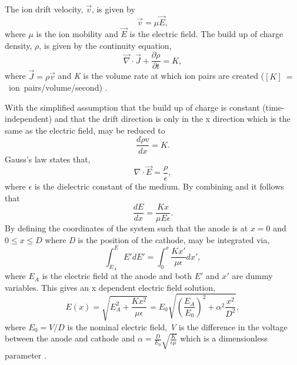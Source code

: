 The ion drift velocity, $\vec v$, is given by
\begin{equation}
    \vec v = \mu \vec E,
\end{equation}
where $\mu$ is the ion mobility and $\vec E$ is the electric field. The build up of charge density, $\rho$, is given by the continuity equation,
\begin{equation}
    \vec \nabla \cdot \vec J + \frac{\partial \rho}{\partial t} = K,
\label{eq:space_charge_continuity}
\end{equation}
where $\vec J = \rho \vec v$ and \textit{K} is the volume rate at which ion pairs are created \newline ($[K]~=~$~ion~pairs/volume/second) \cite{space_charge_math}. 

With the simplified assumption that the build up of charge is constant (time-independent) and that the drift direction is only in the x direction which is the same as the electric field,  may be reduced to 
\begin{equation}
    \frac{d \rho v}{dx} = K.
\label{eq:reduced_sapce_charge_continuity}
\end{equation}
Gauss's law states that,
\begin{equation}
    \nabla \cdot \vec E = \frac{\rho}{\epsilon},
\label{eq:Gauss's_law}
\end{equation}
where $\epsilon$ is the dielectric constant of the medium.
By combining  and  it follows that
\begin{equation}
    \frac{dE}{dx} = \frac{Kx}{\mu E \epsilon}.
\label{eq:sc_gauss_combo}
\end{equation}
By defining the coordinates of the system such that the anode is at $x = 0$ and $0 \leq x \leq D$ where \textit{D} is the position of the cathode,  may be integrated via,
\begin{equation}
    \int_{E_A}^E E'dE' = \int_0^x \frac{Kx'}{\mu \epsilon}dx',
\end{equation}
where $E_A$ is the electric field at the anode and both $E'$ and $x'$ are dummy variables. This gives an x dependent electric field solution,
\begin{equation}
    E(x) = \sqrt{E^2_A + \frac{Kx^2}{\mu \epsilon}} = E_0 \sqrt{\left (\frac{E_A}{E_0}\right ) ^2 + \alpha^2 \frac{x^2}{D^2}},
\end{equation}
where $E_0 = V/D$ is the nominal electric field, \textit{V} is the difference in the voltage between the anode and cathode and $\alpha = \frac{D}{E_0}\sqrt{\frac{K}{\epsilon \mu}}$ which is a dimensionless parameter \cite{space_charge_math}.

